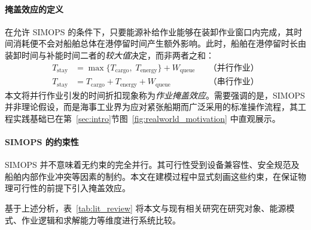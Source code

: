\documentclass[UTF8, a4paper, 12pt]{ctexart}
\begin{document}
\paragraph{掩盖效应的定义}
在允许 SIMOPS 的条件下，只要能源补给作业能够在装卸作业窗口内完成，其时间消耗便不会对船舶总体在港停留时间产生额外影响。此时，船舶在港停留时长由装卸时间与补能时间二者的\emph{较大值}决定，而非两者之和：
\begin{equation*}
\begin{aligned}
T_{\text{stay}} &= \max\{T_{\text{cargo}},\; T_{\text{energy}}\} + W_{\text{queue}}
&& \text{（并行作业）} \\
T_{\text{stay}} &= T_{\text{cargo}} + T_{\text{energy}} + W_{\text{queue}}
&& \text{（串行作业）}
\end{aligned}
\end{equation*}
本文将并行作业引发的时间折扣现象称为\emph{作业掩盖效应}。需要强调的是，SIMOPS 并非理论假设，而是海事工业界为应对紧张船期而广泛采用的标准操作流程，其工程实践基础已在第~\ref{sec:intro}节图~\ref{fig:realworld_motivation} 中直观展示。
 
\paragraph{SIMOPS 的约束性}
SIMOPS 并不意味着无约束的完全并行。其可行性受到设备兼容性、安全规范及船舶内部作业冲突等因素的制约。本文在建模过程中显式刻画这些约束，在保证物理可行性的前提下引入掩盖效应。
 
基于上述分析，表~\ref{tab:lit_review} 将本文与现有相关研究在研究对象、能源模式、作业逻辑和求解能力等维度进行系统比较。
 
\end{document}
